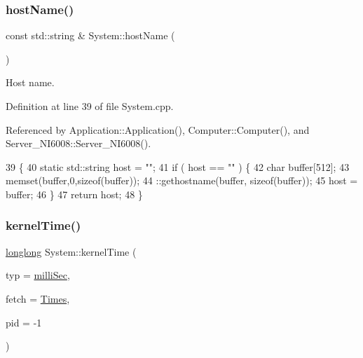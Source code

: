 \subsubsection{\texorpdfstring{host\+Name()}{hostName()}}
{\footnotesize\ttfamily const std\+::string \& System\+::host\+Name (\begin{DoxyParamCaption}{ }\end{DoxyParamCaption})}



Host name. 



Definition at line 39 of file System.\+cpp.



Referenced by Application\+::\+Application(), Computer\+::\+Computer(), and Server\+\_\+\+N\+I6008\+::\+Server\+\_\+\+N\+I6008().


\begin{DoxyCode}
39                                   \{
40   \textcolor{keyword}{static} std::string host = \textcolor{stringliteral}{""};
41   \textcolor{keywordflow}{if} ( host == \textcolor{stringliteral}{""} ) \{
42     \textcolor{keywordtype}{char} buffer[512];
43     memset(buffer,0,\textcolor{keyword}{sizeof}(buffer));
44     ::gethostname(buffer, \textcolor{keyword}{sizeof}(buffer));
45     host = buffer;
46   \}
47   \textcolor{keywordflow}{return} host;
48 \}
\end{DoxyCode}
\mbox{\label{namespaceSystem_a52400aecb0f63c891b51bc958ea064e9}} 
\subsubsection{\texorpdfstring{kernel\+Time()}{kernelTime()}}
{\footnotesize\ttfamily \hyperlink{Kernel_8h_a2e10ca87f14998150dd86073beff4e97}{longlong} System\+::kernel\+Time (\begin{DoxyParamCaption}\item[{\hyperlink{namespaceSystem_a15db094516c062b412df2453b4350f1a}{Time\+Type}}]{typ = {\ttfamily \hyperlink{namespaceSystem_a15db094516c062b412df2453b4350f1aa1b7bae23a29567151c8b8103104c620a}{milli\+Sec}},  }\item[{\hyperlink{namespaceSystem_a71a46d52920ca8e98fc4649949be58a7}{Info\+Type}}]{fetch = {\ttfamily \hyperlink{namespaceSystem_a71a46d52920ca8e98fc4649949be58a7a3f922834570db4b74edefd683ee0424b}{Times}},  }\item[{long}]{pid = {\ttfamily -\/1} }\end{DoxyParamCaption})}

